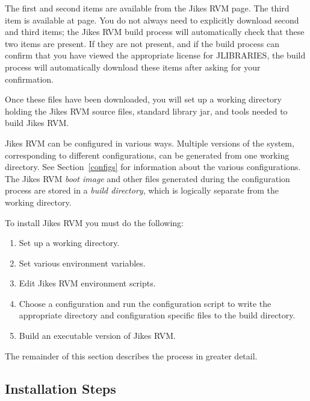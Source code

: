 The first and second items are available  from the Jikes RVM
 page. The third item is available at
 page.  
You do not always need to explicitly download
second and third items; the Jikes RVM build process will automatically
check that these two items are present. If they are not present, and if
the build process can confirm that you have viewed the appropriate license
for JLIBRARIES, the build process
will automatically download these items after asking for your
confirmation. 

Once these files have been downloaded, you will set up 
a working directory holding the Jikes RVM source files, standard
library jar, and tools needed to build Jikes RVM. 

Jikes RVM can be configured in various ways. Multiple versions of the system,
corresponding to different configurations, can be generated from 
one working directory. See Section~\ref{configs} for information about the 
various 
configurations.
The Jikes RVM  {\em boot image} and other files generated during the 
configuration process
are stored in a {\em build directory}, which is logically separate from 
the working directory. 

To install Jikes RVM  you must do the following:
\begin{enumerate}
\item Set up a working directory.
\item Set various environment variables.
\item Edit Jikes RVM environment scripts.
\item Choose a configuration and run the configuration script to write
the appropriate directory and configuration specific files to the
build directory.
\item Build an executable version of Jikes RVM.
\end{enumerate}

The remainder of this section describes the process in greater detail.

\JikesTMFooter

\subsection{Installation Steps}

